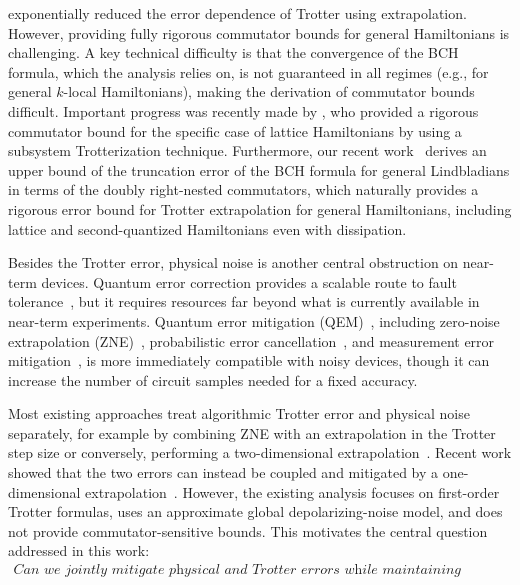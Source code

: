 \documentclass[11pt]{article}
\begin{document}
\citet{watson2025exponentially} exponentially reduced the error dependence of Trotter using extrapolation. However, providing fully rigorous commutator bounds for general Hamiltonians is challenging. A key technical difficulty is that the convergence of the BCH formula, which the analysis relies on, is not guaranteed in all regimes (e.g., for general $k$-local Hamiltonians), making the derivation of commutator bounds difficult. Important progress was recently made by \citet{mizuta2025commutator}, who provided a rigorous commutator bound for the specific case of lattice Hamiltonians by using a subsystem Trotterization technique.
Furthermore, our recent work~\cite{wang2026lindbladiansimulationcommutatorbounds} derives an upper bound of the truncation error of the BCH formula for general Lindbladians in terms of the doubly right-nested commutators, which naturally provides a rigorous error bound for Trotter extrapolation for general Hamiltonians, including lattice and second-quantized Hamiltonians even with dissipation.

Besides the Trotter error, physical noise is another central obstruction on near-term devices. Quantum error correction provides a scalable route to fault tolerance~\cite{Terhal_2015}, but it requires resources far beyond what is currently available in near-term experiments. Quantum error mitigation (QEM)~\cite{cai2023quantum}, including zero-noise extrapolation (ZNE)~\cite{li2017efficient, PhysRevLett.119.180509}, probabilistic error cancellation~\cite{EndoBenjaminLi2018, berg_probabilistic_2023}, and measurement error mitigation~\cite{Bravyi2021measurement, Nation2021scalable}, is more immediately compatible with noisy devices, though it can increase the number of circuit samples needed for a fixed accuracy.


Most existing approaches treat algorithmic Trotter error and physical noise separately, for example by combining ZNE with an extrapolation in the Trotter step size or conversely, performing a two-dimensional extrapolation~\cite{vazquez2023well}. Recent work showed that the two errors can instead be coupled and mitigated by a one-dimensional extrapolation~\cite{hakkaku2025dataefficienterrormitigationphysical}. However, the existing analysis focuses on first-order Trotter formulas, uses an approximate global depolarizing-noise model, and does not provide commutator-sensitive bounds. This motivates the central question addressed in this work:
\begin{align*}
    \textit{Can we jointly mitigate physical and Trotter errors while maintaining commutator scaling?}
\end{align*}
\end{document}
